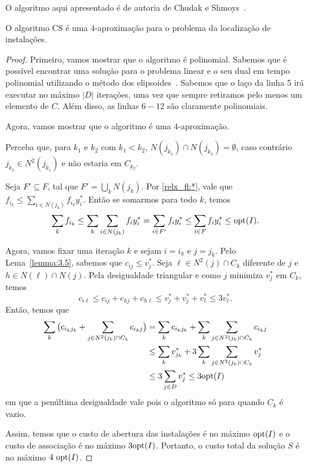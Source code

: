 O algoritmo aqui apresentado é de autoria de Chudak e Shmoys~\cite{Chudak2003}.
\begin{theorem}
    O algoritmo {\sc CS} é uma $4$-aproximação para o problema da localização de instalações.
\end{theorem}
\begin{proof}
    Primeiro, vamos mostrar que o algoritmo é polinomial. Sabemos que é possível encontrar uma solução para o problema linear e o seu dual em tempo polinomial utilizando o método dos elipsoides~\cite{Kha79}. Sabemos que o laço da linha 5 irá executar no máximo $|D|$ iterações, uma vez que sempre retiramos pelo menos um elemento de $C$. Além disso, as linhas $6-12$ são claramente polinomiais.

    Agora, vamos mostrar que o algoritmo é uma $4$-aproximação.

    Perceba que, para $k_1$ e $k_2$ com $k_1 < k_2$, $N(j_{k_1})\cap N(j_{k_2}) = \emptyset$, caso contrário $j_{k_2} \in N^2(j_{k_1})$ e não estaria em $C_{k_2}$.

    Seja $F' \subseteq F$, tal que $F' = \bigcup_k N(j_k)$.
    Por \eqref{relx_fl:*}, vale que $f_{i_k} \leq \sum_{i \in N(j_k)}f_{i_k}y^*_{i}$. Então se somarmos para todo $k$, temos
    \[ \sum_kf_{i_k} \leq \sum_k \sum_{i \in N(j_k)}f_{i}y^*_{i} = \sum_{i \in F'}f_{i}y^*_{i} \leq \sum_{i \in F}f_{i}y^*_{i} \leq \mathrm{opt}(I).\]

    Agora, vamos fixar uma iteração $k$ e sejam $i = i_k$ e $j = j_k$. Pelo Lema~\ref{lemma:3.5}, sabemos que $c_{ij} \leq v^*_j$. Seja $\ell \in N^2(j) \cap C_k$ diferente de $j$ e $h \in N(\ell) \cap N(j)$. Pela desigualdade triangular e como $j$ minimiza $v^*_j$ em $C_k$, temos
    \[ c_{i\ell} \leq c_{ij} + c_{hj} + c_{h\ell} \leq v_j^* + v_j^* + v_{\ell}^* \leq 3 v_{\ell}^*.
        \]
    Então, temos que
    \begin{subequations}
        \begin{align*}
        \sum_{k} {\big (}c_{i_kj_k} + \sum_{j \in N^2(j_k)\cap C_k} c_{i_kj} {\big )} &= \sum_{k} c_{i_kj_k} + \sum_{k}\sum_{j \in N^2(j_k)\cap C_k} c_{i_kj}\\
        &\leq \sum_k v^*_{j_k} + 3\sum_{k}\sum_{j \in N^2(j_k)\cap C_k} v^*_j\\
        &\leq 3 \sum_{j \in D}v^*_j \leq 3\mathrm{opt}(I)           
        \end{align*}
    \end{subequations}
    em que a penúltima desigualdade vale pois o algoritmo só para quando $C_k$ é vazio.

    Assim, temos que o custo de abertura das instalações é no máximo $\mathrm{opt}(I)$ e o custo de associação é no máximo $3\mathrm{opt}(I)$. Portanto, o custo total da solução $S$ é no máximo $4~\mathrm{opt}(I)$.
\end{proof}
